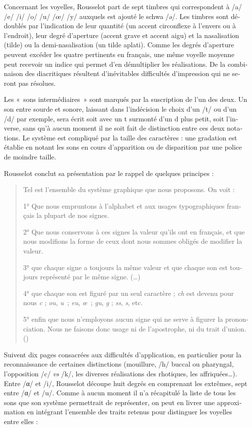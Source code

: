 \documentclass[output=paper]{../langscibook}
\begin{document}
\begin{otherlanguage}{french}
Concernant les voyelles, Rousselot part de sept timbres qui correspondent à /a/ /e/ /i/ /o/ /u/ /œ/ /y/ auxquels est ajouté le schwa /\textlatin{ə}/. Les timbres sont dédoublés par l’indication de leur quantité (un accent circonflexe à l’envers ou à l’endroit), leur degré d’aperture (accent grave et accent aigu) et la nasalisation (tilde) ou la demi-nasalisation (un tilde aplati). Comme les degrés d’aperture peuvent excéder les quatre pertinents en français, une même voyelle moyenne peut recevoir un indice qui permet d’en démultiplier les réalisations. De la combinaison des diacritiques résultent d’inévitables difficultés d’impression qui ne seront pas résolues.

Les «~sons intermédiaires~» sont marqués par la suscription de l’un des deux. Un son entre sourde et sonore, laissant dans l’indécision le choix d’un /t/ ou d’un /d/ par exemple, sera écrit soit avec un t surmonté d’un d plus petit, soit l’inverse, sans qu’à aucun moment il ne soit fait de distinction entre ces deux notations. Le système est compliqué par la taille des caractères : une gradation est établie en notant les sons en cours d’apparition ou de disparition par une police de moindre taille.

Rousselot conclut sa présentation par le rappel de quelques principes :

\begin{quote}
    Tel est l’ensemble du système graphique que nous proposons. On voit :

    1° Que nous empruntons à l’alphabet et aux usages typographiques français la plupart de nos signes.

    2° Que nous conservons à ces signes la valeur qu’ils ont en français, et que nous modifions la forme de ceux dont nous sommes obligés de modifier la valeur.

    3° que chaque signe a toujours la même valeur et que chaque son est toujours représenté par le même signe. (…)

    4° que chaque son est figuré par un seul caractère ; \textit{ch} est devenu pour nous \textit{c} ; \textit{ou}, \textit{u~}; \textit{eu}, \textit{œ~}; \textit{gu}, \textit{g} ; \textit{ss}, \textit{s}, etc.

    5° enfin que nous n’employons aucun signe qui ne serve à figurer la prononciation. Nous ne faisons donc usage ni de l’apostrophe, ni du trait d’union. (\citealt[6--7]{rousselot_introduction_1887})
\end{quote}

Suivent dix pages consacrées aux difficultés d’application, en particulier pour la reconnaissance de certaines distinctions (mouillure, /h/ buccal ou pharyngal, l’opposition /c/ \textit{vs} /k/, les diverses réalisations des rhotiques, les affriquées…). Entre /α/ et /i/, Rousselot découpe huit degrés en comprenant les extrêmes, sept entre /α/ et /u/. Comme à aucun moment il n’a récapitulé la liste de tous les sons que son système permettrait de représenter, on peut en livrer une approximation en intégrant l’ensemble des traits retenus pour distinguer les voyelles entre elles :


\end{otherlanguage}
\end{document}
